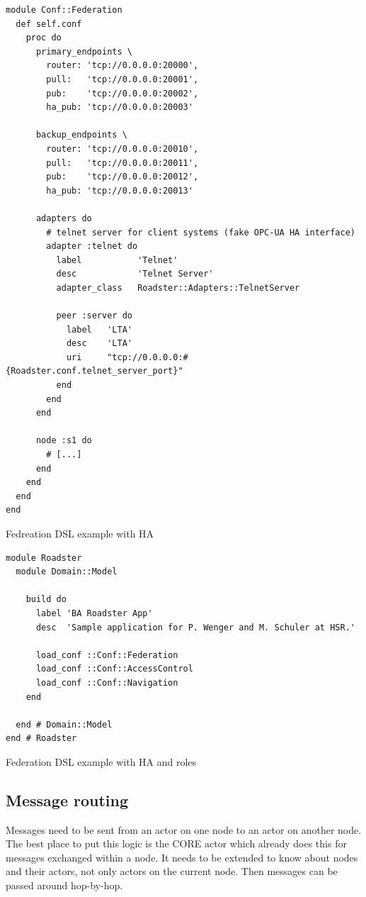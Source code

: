 \begin{listing}
	\begin{verbatim}
module Conf::Federation
  def self.conf
    proc do
      primary_endpoints \
        router: 'tcp://0.0.0.0:20000',
        pull:   'tcp://0.0.0.0:20001',
        pub:    'tcp://0.0.0.0:20002',
        ha_pub: 'tcp://0.0.0.0:20003'

      backup_endpoints \
        router: 'tcp://0.0.0.0:20010',
        pull:   'tcp://0.0.0.0:20011',
        pub:    'tcp://0.0.0.0:20012',
        ha_pub: 'tcp://0.0.0.0:20013'

      adapters do
        # telnet server for client systems (fake OPC-UA HA interface)
        adapter :telnet do
          label           'Telnet'
          desc            'Telnet Server'
          adapter_class   Roadster::Adapters::TelnetServer

          peer :server do
            label   'LTA'
            desc    'LTA'
            uri     "tcp://0.0.0.0:#{Roadster.conf.telnet_server_port}"
          end
        end
      end

      node :s1 do
        # [...]
      end
    end
  end
end
	\end{verbatim}
	\caption{Fedreation DSL example with HA}
	\label{lst:dsl:topo:with-ha}
\end{listing}

\begin{listing}
	\begin{verbatim}
module Roadster
  module Domain::Model

    build do
      label 'BA Roadster App'
      desc  'Sample application for P. Wenger and M. Schuler at HSR.'

      load_conf ::Conf::Federation
      load_conf ::Conf::AccessControl
      load_conf ::Conf::Navigation
    end

  end # Domain::Model
end # Roadster
	\end{verbatim}
	\caption{Federation DSL example with HA and roles}
	\label{lst:dsl:topo:with-roles}
\end{listing}


\subsection{Message routing}
Messages need to be sent from an actor on one node to an actor on another node.
The best place to put this logic is the CORE actor which already does this for
messages exchanged within a node. It needs to be extended to know about nodes
and their actors, not only actors on the current node. Then messages can be
passed around hop-by-hop.

